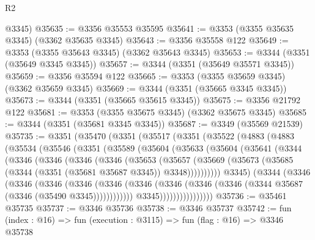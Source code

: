 \begin{lexlean}{R2}
\begin{coremodule}
      @3345)
@35635 := @3356 @35553 @35595
@35641 := @3353 (@3355 @35635 @3345) (@3362 @35635 @3345)
@35643 := @3356 @35558 @122
@35649 := @3353 (@3355 @35643 @3345) (@3362 @35643 @3345)
@35653 := @3344 (@3351 (@35649 @3345 @3345))
@35657 := @3344 (@3351 (@35649 @35571 @3345))
@35659 := @3356 @35594 @122
@35665 := @3353 (@3355 @35659 @3345) (@3362 @35659 @3345)
@35669 := @3344 (@3351 (@35665 @3345 @3345))
@35673 := @3344 (@3351 (@35665 @35615 @3345))
@35675 := @3356 @21792 @122
@35681 := @3353 (@3355 @35675 @3345) (@3362 @35675 @3345)
@35685 := @3344 (@3351 (@35681 @3345 @3345))
@35687 := @3349 (@35569 @21539)
@35735 := @3351
    (@35470
      (@3351
        (@35517
          (@3351
            (@35522
              (@4883
                (@4883
                  (@35534
                    (@35546
                      (@3351
                        (@35589
                          (@35604
                            (@35633
                              (@35604
                                (@35641
                                  (@3344
                                    (@3346
                                      (@3346
                                        (@3346
                                          (@3346
                                            (@35653
                                              (@35657
                                                (@35669
                                                  (@35673
                                                    (@35685
                                                      (@3344
                                                        (@3351 (@35681 @35687 @3345))
                                                        @3348))))))))))
                                    @3345)
                                  (@3344
                                    (@3346
                                      (@3346
                                        (@3346
                                          (@3346
                                            (@3346
                                              (@3346
                                                (@3346
                                                  (@3346
                                                    (@3346
                                                      (@3344 @35687 (@3346 (@35490 @3345))))))))))))
                                    @3345))))))))))))))))
@35736 := @35461 @35735
@35737 := @3346 @35736
@35738 := @3346 @35737
@35742 := fun (index : @16) => fun (execution : @3115) => fun (flag : @16) => @3346 @35738

\end{coremodule}
\end{lexlean}
